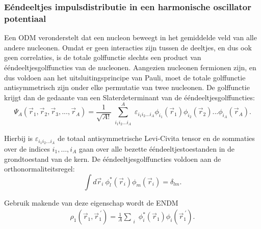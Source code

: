 \documentclass[11pt,twoside]{book}
\begin{document}
\subsubsection{E\'{e}ndeeltjes impulsdistributie in een harmonische oscillator potentiaal}
Een ODM veronderstelt dat een nucleon beweegt in het gemiddelde veld van alle andere nucleonen. Omdat er geen interacties zijn tussen de deeltjes, en dus ook geen correlaties, is de totale golffunctie slechts een product van \'{e}\'{e}ndeeltjesgolffuncties van de nucleonen. Aangezien nucleonen fermionen zijn, en dus voldoen aan het uitsluitingsprincipe van Pauli, moet de totale golffunctie antisymmetrisch zijn onder elke permutatie van twee nucleonen. De golffunctie krijgt dan de gedaante van een Slaterdeterminant van de \'{e}\'{e}ndeeltjesgolffuncties:
\begin{equation} \label{eq:slater}
\Psi_A(\vec{r}_1,\vec{r}_2,\vec{r}_3, ... ,\vec{r}_A)= \frac{1}{\sqrt{A!}} \sum^A_{\substack{i_1 i_2 \ldots i_A}} 
													  \varepsilon_{i_1 i_2 \ldots i_A} \phi_{i_1}(\vec{r}_1)
													         \phi_{i_2}(\vec{r}_2)...
													         \phi_{i_A}(\vec{r}_A).
\end{equation}

Hierbij is $\varepsilon_{i_1 i_2 \ldots i_A}$ de totaal antisymmetrische Levi-Civita tensor en de sommaties over de indices $i_1,\ldots ,i_A$  gaan over alle bezette \'{e}\'{e}ndeeltjestoestanden in de grondtoestand van de kern. De \'{e}\'{e}ndeeltjesgolffuncties voldoen aan de orthonormaliteitsregel:
\begin{equation} \label{eq:orthogonality}
\int d\vec{r}_i\  \phi^*_l(\vec{r}_i)\phi_m(\vec{r}_i) = \delta_{lm}.
\end{equation}

Gebruik makende van deze eigenschap wordt de ENDM 
\begin{align} \label{eq:1pmd}
\rho_1(\vec{r}_1,\vec{r}^{\ \prime}_1) = \frac{1}{A}\sum_{\substack{i}} \phi^*_i(\vec{r}_1) \phi_i(\vec{r}_1^{\ \prime}).
\end{align}
\end{document}
